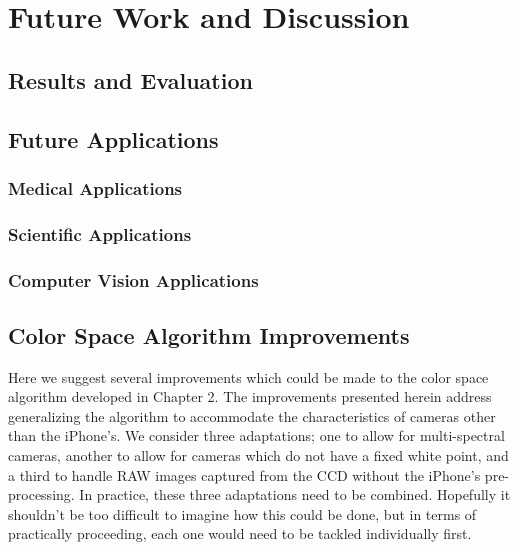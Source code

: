 
\chapter{Future Work and Discussion}

\ifpdf
    \graphicspath{{Chapter5/Figs/Raster/}{Chapter5/Figs/PDF/}{Chapter5/Figs/}}
\else
    \graphicspath{{Chapter5/Figs/Vector/}{Chapter5/Figs/}}
\fi
\section{Results and Evaluation}\label{sec:ResultsAndEvaluation}

\section{Future Applications}\label{sec:FutureApplications}


\subsection{Medical Applications}\label{sec:MedicalApplications}

\subsection{Scientific Applications}\label{sec:ScientificApplications}

\subsection{Computer Vision Applications}\label{sec:ComputerVisionApplications}


\section{Color Space Algorithm Improvements}\label{sec:ColorSpaceAlgorithmImprovements}
Here we suggest several improvements which could be made to the color space algorithm developed in Chapter 2. The improvements presented herein address generalizing the algorithm to accommodate the characteristics of cameras other than the iPhone's. We consider three adaptations; one to allow for multi-spectral cameras, another to allow for cameras which do not have a fixed white point, and a third to handle RAW images captured from the CCD without the iPhone's pre-processing. In practice, these three adaptations need to be combined. Hopefully it shouldn't be too difficult to imagine how this could be done, but in terms of practically proceeding, each one would need to be tackled individually first.

